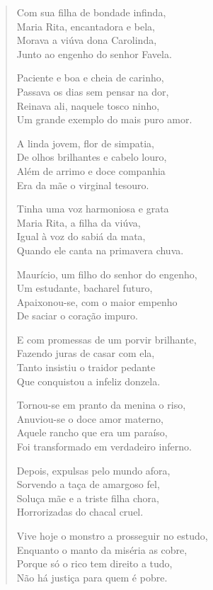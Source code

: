 \begin{verse}
Com sua filha de bondade infinda,\\
Maria Rita, encantadora e bela,\\
Morava a viúva dona Carolinda,\\
Junto ao engenho do senhor Favela.

Paciente e boa e cheia de carinho,\\
Passava os dias sem pensar na dor,\\
Reinava ali, naquele tosco ninho,\\
Um grande exemplo do mais puro amor.

A linda jovem, flor de simpatia,\\
De olhos brilhantes e cabelo louro,\\
Além de arrimo e doce companhia\\
Era da mãe o virginal tesouro.

Tinha uma voz harmoniosa e grata\\
Maria Rita, a filha da viúva,\\
Igual à voz do sabiá da mata,\\
Quando ele canta na primavera chuva.

Maurício, um filho do senhor do engenho,\\
Um estudante, bacharel futuro,\\
Apaixonou-se, com o maior empenho\\
De saciar o coração impuro.

E com promessas de um porvir brilhante,\\
Fazendo juras de casar com ela,\\
Tanto insistiu o traidor pedante\\
Que conquistou a infeliz donzela.

Tornou-se em pranto da menina o riso,\\
Anuviou-se o doce amor materno,\\
Aquele rancho que era um paraíso,\\
Foi transformado em verdadeiro inferno.

Depois, expulsas pelo mundo afora,\\
Sorvendo a taça de amargoso fel,\\
Soluça mãe e a triste filha chora,\\
Horrorizadas do chacal cruel.

Vive hoje o monstro a prosseguir no estudo,\\
Enquanto o manto da miséria as cobre,\\
Porque só o rico tem direito a tudo,\\
Não há justiça para quem é pobre.
\end{verse}

